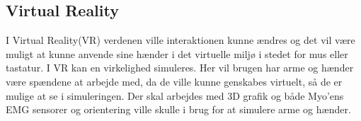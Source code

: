 \subsection{Virtual Reality}
I Virtual Reality(VR) verdenen ville interaktionen kunne ændres og det vil være muligt at kunne anvende sine hænder i det virtuelle miljø i stedet for mus eller tastatur. I VR kan en virkelighed simuleres. Her vil brugen har arme og hænder være spændene at arbejde med, da de ville kunne genskabes virtuelt, så de er mulige at se i simuleringen. Der skal arbejdes med 3D grafik og både Myo'ens EMG sensorer og orientering ville skulle i brug for at simulere arme og hænder.














